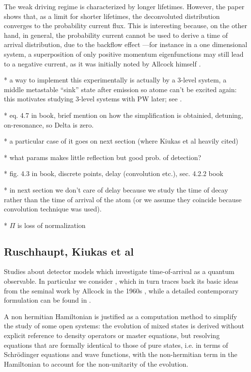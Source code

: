 The weak driving regime is characterized by longer lifetimes.
However, the paper shows that,
as a limit for shorter lifetimes,
the deconvoluted distribution converges
to
the probability current flux.
This is interesting because, on the other hand, in general,
the probability current cannot be used to derive a time of arrival
distribution, due to the backflow effect
---for instance in a one dimensional system, a superposition of only positive momentum eigenfunctions may still lead to a
negative current, as it was initially noted by Allcock himself \parencite{Allcock-3}.

* a way to implement this experimentally is actually by a 3-level system, a middle metastable ``sink'' state after emission so atome can't be excited again: this motivates studying 3-level systems with PW later; see \cite{Metastable}.

* eq. 4.7 in book, brief mention on how the simplification is obtainied, detuning, on-resonance, so Delta is zero.

* a particular case of it goes on next section (where Kiukas et al heavily cited)

* what params makes little reflection but good prob. of detection?

* fig. 4.3 in book, discrete points, delay (convolution etc.), sec. 4.2.2 book

* in next section we don't care of delay because we study the time of decay rather than the time of arrival of the atom (or we assume they coincide because convolution technique was used).

* $\Pi$ is loss of normalization

\subsection{Ruschhaupt, Kiukas et al}\label{sec:hist:detect:kiukas}

Studies
about detector models which investigate
time-of-arrival as a quantum observable.
In particular we consider \cite{RuschhauptAbsorption},
which in turn traces back its basic ideas from the seminal work by Allcock
in the 1960s \parencite{Allcock-1, Allcock-2, Allcock-3},
while a detailed contemporary formulation can be found in
\cite[Ch. 4]{TQM2}.

A non hermitian Hamiltonian is justified as a computation method
to simplify the study of some open systems: the evolution of mixed
states is derived without explicit reference to density operators
or master equations, but resolving equations that are formally
identical to those of pure states,
i.e. in terms of
Schr{\"o}dinger equations and wave functions,
with the non-hermitian term in the Hamiltonian
to account for the non-unitarity of the evolution.

